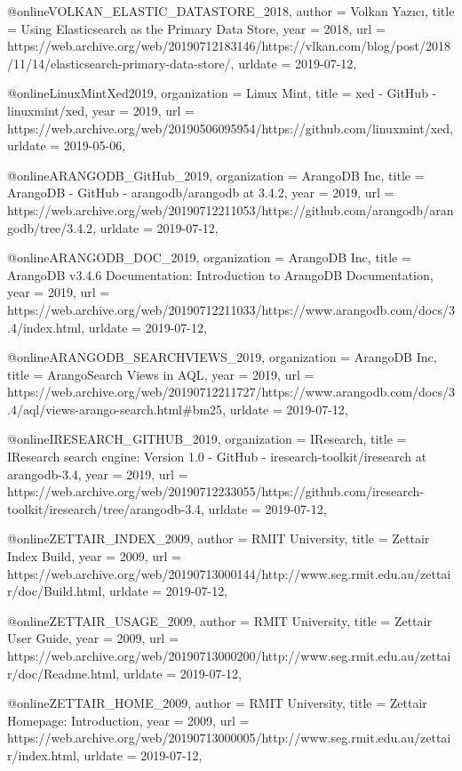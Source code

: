 {@online{VOLKAN_ELASTIC_DATASTORE_2018,
  author = {Volkan Yazıcı},
  title = {Using Elasticsearch as the Primary Data Store},
  year = {2018},
  url = {https://web.archive.org/web/20190712183146/https://vlkan.com/blog/post/2018/11/14/elasticsearch-primary-data-store/},
  urldate = {2019-07-12},
}

@online{LinuxMintXed2019,
  organization = {Linux Mint},
  title = {xed - GitHub - linuxmint/xed},
  year = {2019},
  url = {https://web.archive.org/web/20190506095954/https://github.com/linuxmint/xed},
  urldate = {2019-05-06},
}


@online{ARANGODB_GitHub_2019,
  organization = {ArangoDB Inc},
  title = {ArangoDB - GitHub - arangodb/arangodb at 3.4.2},
  year = {2019},
  url = {https://web.archive.org/web/20190712211053/https://github.com/arangodb/arangodb/tree/3.4.2},
  urldate = {2019-07-12},
}

@online{ARANGODB_DOC_2019,
  organization = {ArangoDB Inc},
  title = {ArangoDB v3.4.6 Documentation: Introduction to ArangoDB Documentation},
  year = {2019},
  url = {https://web.archive.org/web/20190712211033/https://www.arangodb.com/docs/3.4/index.html},
  urldate = {2019-07-12},
}

@online{ARANGODB_SEARCHVIEWS_2019,
  organization = {ArangoDB Inc},
  title = {ArangoSearch Views in AQL},
  year = {2019},
  url = {https://web.archive.org/web/20190712211727/https://www.arangodb.com/docs/3.4/aql/views-arango-search.html#bm25},
  urldate = {2019-07-12},
}

@online{IRESEARCH_GITHUB_2019,
  organization = {IResearch},
  title = {IResearch search engine: Version 1.0 - GitHub - iresearch-toolkit/iresearch at arangodb-3.4},
  year = {2019},
  url = {https://web.archive.org/web/20190712233055/https://github.com/iresearch-toolkit/iresearch/tree/arangodb-3.4},
  urldate = {2019-07-12},
}

@online{ZETTAIR_INDEX_2009,
  author = {{RMIT University}},
  title = {Zettair Index Build},
  year = {2009},
  url = {https://web.archive.org/web/20190713000144/http://www.seg.rmit.edu.au/zettair/doc/Build.html},
  urldate = {2019-07-12},
}

@online{ZETTAIR_USAGE_2009,
  author = {{RMIT University}},
  title = {Zettair User Guide},
  year = {2009},
  url = {https://web.archive.org/web/20190713000200/http://www.seg.rmit.edu.au/zettair/doc/Readme.html},
  urldate = {2019-07-12},
}

@online{ZETTAIR_HOME_2009,
  author = {{RMIT University}},
  title = {Zettair Homepage: Introduction},
  year = {2009},
  url = {https://web.archive.org/web/20190713000005/http://www.seg.rmit.edu.au/zettair/index.html},
  urldate = {2019-07-12},
}

}
